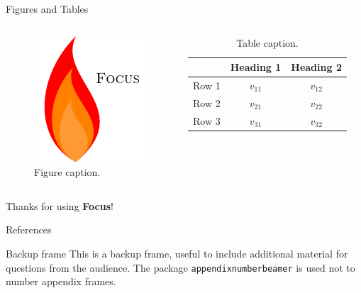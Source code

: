 \documentclass{beamer}
\begin{document}
    \begin{frame}{Figures and Tables}
        \begin{columns}
                \begin{figure}
                    \centering
                    \includegraphics{focuslogo.pdf}
                    \caption{Figure caption.}
                    \label{fig:focuslogo}
                \end{figure}
                
                \begin{table}
                    \centering
                    \begin{tabular}{rcc}
                         & Heading 1 & Heading 2 \\\hline
                        Row 1 & \(v_{11}\) & \(v_{12}\) \\
                        Row 2 & \(v_{21}\) & \(v_{22}\) \\
                        Row 3 & \(v_{31}\) & \(v_{32}\) \\
                    \end{tabular}
                    \caption{Table caption.}
                    \label{tab:demo}
                \end{table}
        \end{columns}
    \end{frame}
    
    \begin{frame}[focus]
        Thanks for using \textbf{Focus}!
    \end{frame}
    
    \appendix
    \begin{frame}{References}
        \nocite{*}
        
        
    \end{frame}
    
    \begin{frame}{Backup frame}
        This is a backup frame, useful to include additional material for questions from the audience.
        \vfill
        The package \texttt{appendixnumberbeamer} is used not to number appendix frames.
    \end{frame}
\end{document}
